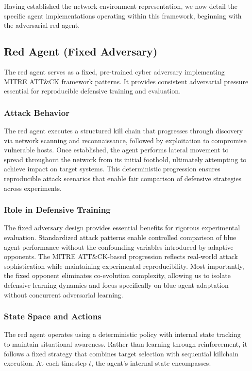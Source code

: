 \documentclass[12pt,oneside]{article}
\begin{document}
Having established the network environment representation, we now detail the specific agent implementations operating within this framework, beginning with the adversarial red agent.

\subsection{Red Agent (Fixed Adversary)}

The red agent serves as a fixed, pre-trained cyber adversary implementing MITRE ATT\&CK framework patterns. It provides consistent adversarial pressure essential for reproducible defensive training and evaluation.

\subsubsection{Attack Behavior}
The red agent executes a structured kill chain that progresses through discovery via network scanning and reconnaissance, followed by exploitation to compromise vulnerable hosts. Once established, the agent performs lateral movement to spread throughout the network from its initial foothold, ultimately attempting to achieve impact on target systems. This deterministic progression ensures reproducible attack scenarios that enable fair comparison of defensive strategies across experiments.

\subsubsection{Role in Defensive Training}
The fixed adversary design provides essential benefits for rigorous experimental evaluation. Standardized attack patterns enable controlled comparison of blue agent performance without the confounding variables introduced by adaptive opponents. The MITRE ATT\&CK-based progression reflects real-world attack sophistication while maintaining experimental reproducibility. Most importantly, the fixed opponent eliminates co-evolution complexity, allowing us to isolate defensive learning dynamics and focus specifically on blue agent adaptation without concurrent adversarial learning.

\subsubsection{State Space and Actions}

The red agent operates using a deterministic policy with internal state tracking to maintain situational awareness. Rather than learning through reinforcement, it follows a fixed strategy that combines target selection with sequential killchain execution. At each timestep $t$, the agent's internal state encompasses:
\end{document}
